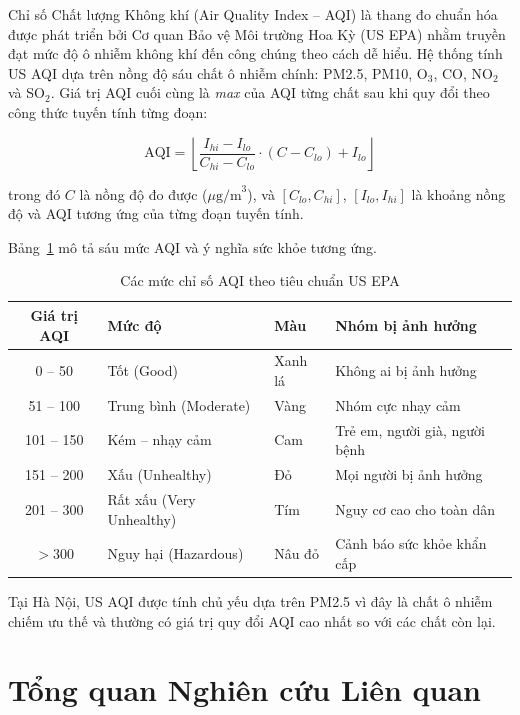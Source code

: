 \documentclass[12pt,a4paper]{report}
\begin{document}
Chỉ số Chất lượng Không khí (Air Quality Index -- AQI) là thang đo chuẩn hóa được phát triển bởi Cơ quan Bảo vệ Môi trường Hoa Kỳ (US EPA) nhằm truyền đạt mức độ ô nhiễm không khí đến công chúng theo cách dễ hiểu. Hệ thống tính US AQI dựa trên nồng độ sáu chất ô nhiễm chính: PM2.5, PM10, O$_3$, CO, NO$_2$ và SO$_2$. Giá trị AQI cuối cùng là \textit{max} của AQI từng chất sau khi quy đổi theo công thức tuyến tính từng đoạn:

\begin{equation}
  \text{AQI} = \left\lfloor \frac{I_{hi} - I_{lo}}{C_{hi} - C_{lo}} \cdot (C - C_{lo}) + I_{lo} \right\rfloor
\end{equation}

trong đó $C$ là nồng độ đo được ($\mu\text{g/m}^3$), và $[C_{lo}, C_{hi}]$, $[I_{lo}, I_{hi}]$ là khoảng nồng độ và AQI tương ứng của từng đoạn tuyến tính.

Bảng~\ref{tab:aqi_levels} mô tả sáu mức AQI và ý nghĩa sức khỏe tương ứng.

\begin{table}[H]
\centering
\caption{Các mức chỉ số AQI theo tiêu chuẩn US EPA}
\label{tab:aqi_levels}
\begin{tabular}{clll}
\toprule
\textbf{Giá trị AQI} & \textbf{Mức độ} & \textbf{Màu} & \textbf{Nhóm bị ảnh hưởng} \\
\midrule
0 -- 50   & Tốt (Good)                  & \cellcolor{cgood!30}Xanh lá  & Không ai bị ảnh hưởng \\
51 -- 100 & Trung bình (Moderate)       & \cellcolor{cmoderate!40}Vàng  & Nhóm cực nhạy cảm \\
101 -- 150 & Kém -- nhạy cảm            & \cellcolor{csensitive!40}Cam  & Trẻ em, người già, người bệnh \\
151 -- 200 & Xấu (Unhealthy)            & \cellcolor{cunhealthy!40}Đỏ   & Mọi người bị ảnh hưởng \\
201 -- 300 & Rất xấu (Very Unhealthy)   & \cellcolor{cvery!30}Tím      & Nguy cơ cao cho toàn dân \\
$> 300$   & Nguy hại (Hazardous)        & \cellcolor{chazard!50}Nâu đỏ & Cảnh báo sức khỏe khẩn cấp \\
\bottomrule
\end{tabular}
\end{table}

Tại Hà Nội, US AQI được tính chủ yếu dựa trên PM2.5 vì đây là chất ô nhiễm chiếm ưu thế và thường có giá trị quy đổi AQI cao nhất so với các chất còn lại.

\section{Tổng quan Nghiên cứu Liên quan}
\end{document}
